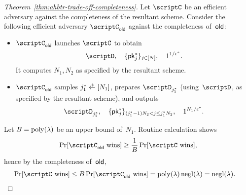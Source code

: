 \begin{proof}
[%
Theorem~\ref{thm:ahbtr-trade-off-completeness}]
Let $\scriptC$ be an efficient adversary against the completeness of the resultant scheme.
Consider the following efficient adversary $\scriptC_\OLD$ against the completeness of~$\OLD$:
\begin{itemize}
\item $\scriptC_\OLD$ launches $\scriptC$ to obtain
\begin{align*}
\scriptD,\quad
\{\pk^\ast_j\}_{j\in[N]},\quad
1^{1/\epsilon^\ast}.
\end{align*}
It computes $N_1,N_2$ as specified by the resultant scheme.
\item $\scriptC_\OLD$ samples ${j^\ast_1\draws[N_1]}$,
prepares $\scriptD_{j^\ast_1}$ (using~$\scriptD$, as specified by the resultant scheme), and outputs
\begin{align*}
\scriptD_{j^\ast_1},\quad
\{\pk^\ast_j\}_{(j^\ast_1-1)N_2<j\leq j^\ast_1N_2},\quad
1^{N_1/\epsilon^\ast}.
\end{align*}
\end{itemize}
Let ${B=\operatorname{poly}(\lambda)}$ be an upper bound of~$N_1$.
Routine calculation shows
\begin{align*}
\Pr[\scriptC_\OLD\textup{ wins}]
\geq
\frac{1}{B}\Pr[\scriptC\textup{ wins}],
\end{align*}
hence by the completeness of~$\OLD$,
\begin{align*}
\Pr[\scriptC\textup{ wins}]
&{}\leq
B\Pr[\scriptC_\OLD\textup{ wins}]
=
\poly(\lambda)\negl(\lambda)
=
\negl(\lambda).
\qedhere
\end{align*}
\end{proof}
